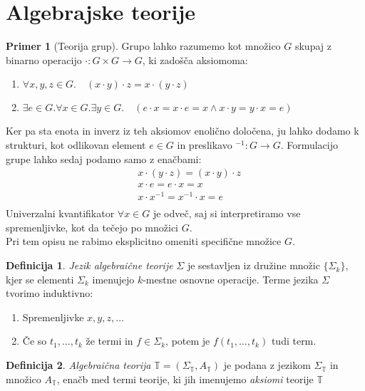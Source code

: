 \documentclass[12pt,a4paper]{book}
\theoremstyle{definition}
\newtheorem{definicija}{Definicija}[chapter]
\theoremstyle{plain}
\theoremstyle{definition}
\newtheorem{primer}{Primer}[section]
\theoremstyle{remark}
\begin{document}
\section{Algebrajske teorije}
%
\begin{primer}[Teorija grup]
Grupo lahko razumemo kot množico $G$ skupaj z binarno operacijo $\cdot : G \times G \to G$, ki zadošča aksiomoma:
%
\begin{enumerate}
\item $\forall x,y,z \in G . \quad (x\cdot y) \cdot z = x \cdot (y \cdot z)$
\item $\exists e \in G . \forall x \in G . \exists y \in G . \quad (e \cdot x = x \cdot e = x \wedge x \cdot y = y \cdot x = e)$
\end{enumerate}
\end{primer}
Ker pa sta enota in inverz iz teh aksiomov enolično določena, ju lahko dodamo k strukturi, kot odlikovan element $e \in G$ in preslikavo $^{-1} : G \to G$.
%
Formulacijo grupe lahko sedaj podamo samo z enačbami:
\vspace{1em}
\begin{align*}
&x \cdot (y \cdot z) = (x \cdot y) \cdot z \\
&x \cdot e = e \cdot x = x \\
&x \cdot x^{-1} = x^{-1} \cdot x = e \\
\end{align*}
Univerzalni kvantifikator $\forall x \in G$ je odveč, saj si interpretiramo vse spremenljivke, kot da tečejo po množici $G$. \\
Pri tem opisu ne rabimo eksplicitno omeniti specifične množice $G$.
%
\begin{definicija}
\emph{Jezik algebraične teorije} $\Sigma$ je sestavljen iz družine množic $\lbrace \Sigma_k \rbrace$, kjer se elementi $\Sigma_k$ imenujejo $k$-mestne osnovne operacije. Terme jezika $\Sigma$ tvorimo induktivno:
\begin{enumerate}
\item Spremenljivke $x,y,z, \ldots$
\item Če so $t_1, \ldots, t_k$ že termi in $f \in \Sigma_k$, potem je $f(t_1,\ldots, t_k)$ tudi term.
\end{enumerate}
\end{definicija}
%
\begin{definicija}
\emph{Algebraična teorija} $\mathbb{T} = (\Sigma_\mathbb{T}, A_\mathbb{T})$ je podana z jezikom $\Sigma_\mathbb{T}$ in množico $A_\mathbb{T}$, enačb med termi teorije, ki jih imenujemo \emph{aksiomi} teorije $\mathbb{T}$
\end{definicija}
\end{document}
